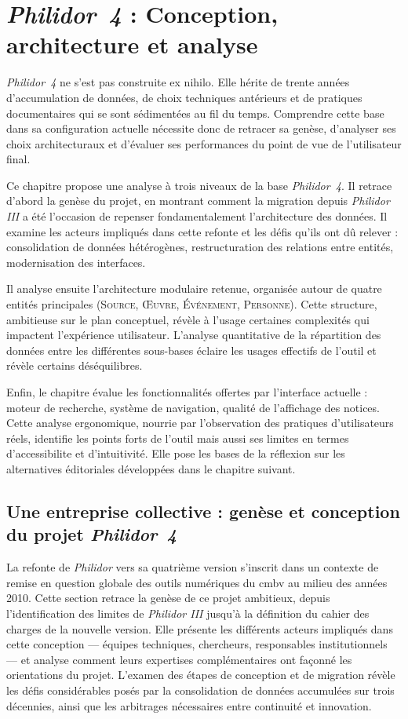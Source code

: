 \chapter[Philidor~4]{\textit{Philidor~4} : Conception, architecture et analyse}

\textit{Philidor~4} ne s'est pas construite ex nihilo. Elle hérite de trente années d'accumulation de données, de choix techniques antérieurs et de pratiques documentaires qui se sont sédimentées au fil du temps. Comprendre cette base dans sa configuration actuelle nécessite donc de retracer sa genèse, d'analyser ses choix architecturaux et d'évaluer ses performances du point de vue de l'utilisateur final.

Ce chapitre propose une analyse à trois niveaux de la base \textit{Philidor~4}. Il retrace d'abord la genèse du projet, en montrant comment la migration depuis \textit{Philidor III} a été l'occasion de repenser fondamentalement l'architecture des données. Il examine les acteurs impliqués dans cette refonte et les défis qu'ils ont dû relever : consolidation de données hétérogènes, restructuration des relations entre entités, modernisation des interfaces.

Il analyse ensuite l'architecture modulaire retenue, organisée autour de quatre entités principales (\textsc{Source}, \textsc{Œuvre}, \textsc{Événement}, \textsc{Personne}). Cette structure, ambitieuse sur le plan conceptuel, révèle à l'usage certaines complexités qui impactent l'expérience utilisateur. L'analyse quantitative de la répartition des données entre les différentes sous-bases éclaire les usages effectifs de l'outil et révèle certains déséquilibres.

Enfin, le chapitre évalue les fonctionnalités offertes par l'interface actuelle : moteur de recherche, système de navigation, qualité de l'affichage des notices. Cette analyse ergonomique, nourrie par l'observation des pratiques d'utilisateurs réels, identifie les points forts de l'outil mais aussi ses limites en termes d'\gls{accessibilite} et d'intuitivité. Elle pose les bases de la réflexion sur les alternatives éditoriales développées dans le chapitre suivant.

\section{Une entreprise collective : genèse et conception du projet \textit{Philidor~4}}

La refonte de \textit{Philidor} vers sa quatrième version s'inscrit dans un contexte de remise en question globale des outils numériques du \gls{cmbv} au milieu des années 2010. Cette section retrace la genèse de ce projet ambitieux, depuis l'identification des limites de \textit{Philidor III} jusqu'à la définition du cahier des charges de la nouvelle version. Elle présente les différents acteurs impliqués dans cette conception --- équipes techniques, chercheurs, responsables institutionnels --- et analyse comment leurs expertises complémentaires ont façonné les orientations du projet. L'examen des étapes de conception et de migration révèle les défis considérables posés par la consolidation de données accumulées sur trois décennies, ainsi que les arbitrages nécessaires entre continuité et innovation.

